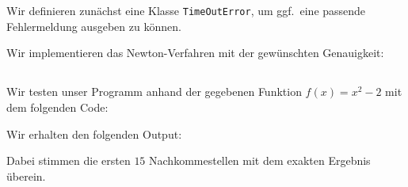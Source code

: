 \section{}





\subsection{}

Wir definieren zunächst eine Klasse \texttt{TimeOutError}, um ggf.\ eine passende Fehlermeldung ausgeben zu können.



Wir implementieren das Newton-Verfahren mit der gewünschten Genauigkeit:







\subsection{}

Wir testen unser Programm anhand der gegebenen Funktion $f(x) = x^2 - 2$ mit dem folgenden Code:



Wir erhalten den folgenden Output:


Dabei stimmen die ersten $15$ Nachkommestellen mit dem exakten Ergebnis überein.
